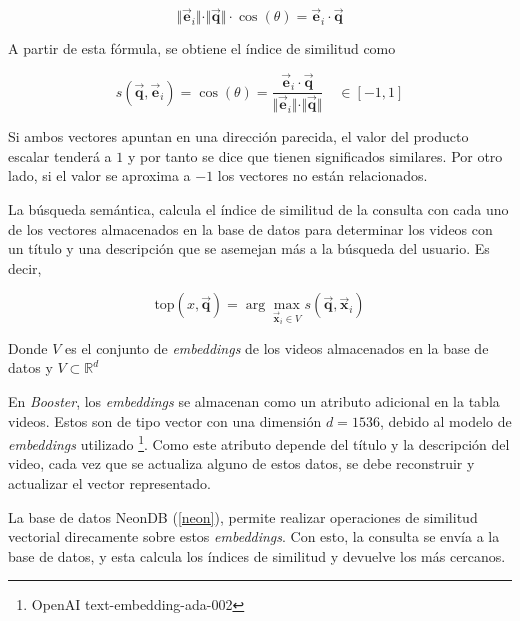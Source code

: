 \begin{equation}
    \Vert \vec{\mathbf{e}}_i \Vert \cdot \Vert \vec{\mathbf{q}} \Vert \cdot \cos(\theta)  = \vec{\mathbf{e}}_i \cdot \vec{\mathbf{q}} 
\end{equation}

A partir de esta fórmula, se obtiene el índice de similitud como

\begin{equation}
    s( \vec{\mathbf{q}} ,\vec{\mathbf{e}}_i) = \cos (\theta ) = \frac{\vec{\mathbf{e}}_i \cdot \vec{\mathbf{q}} }{\Vert \vec{\mathbf{e}}_i \Vert \cdot \Vert \vec{\mathbf{q}} \Vert}  \quad  \in  [-1,1]
\end{equation}

Si ambos vectores apuntan en una dirección parecida, el valor del producto escalar tenderá a $1$ y por tanto se dice que tienen significados similares. Por otro lado, si el valor se aproxima a $-1$ los vectores no están relacionados. 

La búsqueda semántica, calcula el índice de similitud de la consulta con cada uno de los vectores almacenados en la base de datos para determinar los videos con un título y una descripción que se asemejan más a la búsqueda del usuario. Es decir, 

\begin{equation}
    \text{top}(x,\vec{\mathbf{q}}) = \arg \max _{\vec{\mathbf{x}}_i \in V } s(\vec{\mathbf{q}},\vec{\mathbf{x}}_i)
\end{equation}

Donde $V$ es el conjunto de \textit{embeddings} de los videos almacenados en la base de datos y $V \subset \mathbb{R} ^ d $

En \textit{Booster}, los \textit{embeddings} se almacenan como un atributo adicional en la tabla videos. Estos son de tipo vector con una dimensión $d = 1536$, debido al modelo de \textit{embeddings} utilizado \footnote{OpenAI text-embedding-ada-002}. Como este atributo depende del título y la descripción del video, cada vez que se actualiza alguno de estos datos, se debe reconstruir y actualizar el vector representado. 

La base de datos NeonDB (\ref{neon}), permite realizar operaciones de similitud vectorial direcamente sobre estos \textit{embeddings}. Con esto, la consulta se envía a la base de datos, y esta calcula los índices de similitud y devuelve los más cercanos. 








